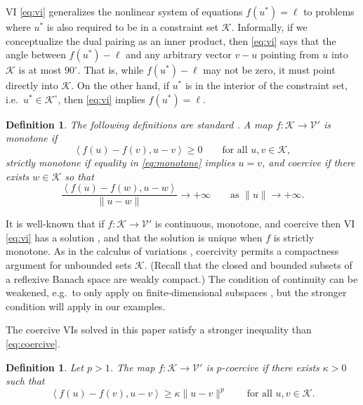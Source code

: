 \documentclass[letterpaper,final,12pt,reqno]{amsart}
\theoremstyle{cstyle}
\theoremstyle{cstyle*}
\theoremstyle{dstyle}
\newtheorem{definition}[theorem]{Definition}
\numberwithin{equation}{section}
\numberwithin{figure}{section}
\numberwithin{table}{section}
\numberwithin{theorem}{section}
\newcommand{\cK}{\mathcal{K}}
\newcommand{\cV}{\mathcal{V}}
\newcommand{\ip}[2]{\left<#1,#2\right>}
\begin{document}
VI \eqref{eq:vi} generalizes the nonlinear system of equations $f(u^*)=\ell$ to problems where $u^*$ is also required to be in a constraint set $\cK$.  Informally, if we conceptualize the dual pairing as an inner product, then \eqref{eq:vi} says that the angle between $f(u^*)-\ell$ and any arbitrary vector $v-u$ pointing from $u$ into $\cK$ is at most $90^\circ$.  That is, while $f(u^*)-\ell$ may not be zero, it must point directly into $\cK$.  On the other hand, if $u^*$ is in the interior of the constraint set, i.e.~$u^*\in\cK^\circ$, then \eqref{eq:vi} implies $f(u^*)=\ell$.

\begin{definition} The following definitions are standard \cite{KinderlehrerStampacchia1980}.  A map $f:\cK \to \cV'$ is \emph{monotone} if
\begin{equation}
\ip{f(u)-f(v)}{u-v} \ge 0 \qquad \text{for all } u,v \in \cK, \label{eq:monotone}
\end{equation}
\emph{strictly monotone} if equality in \eqref{eq:monotone} implies $u=v$, and \emph{coercive} if there exists $w \in \cK$ so that
\begin{equation}
\frac{\ip{f(u)-f(w)}{u-w}}{\|u-w\|} \to +\infty \qquad \text{as } \|u\|\to +\infty. \label{eq:coercive}
\end{equation}
\end{definition}

It is well-known that if $f:\cK \to \cV'$ is continuous, monotone, and coercive then VI \eqref{eq:vi} has a solution \cite[Corollary III.1.8]{KinderlehrerStampacchia1980}, and that the solution is unique when $f$ is strictly monotone.  As in the calculus of variations \cite{Evans2010}, coercivity permits a compactness argument for unbounded sets $\cK$.  (Recall that the closed and bounded subsets of a reflexive Banach space are weakly compact.)  The condition of continuity can be weakened, e.g.~to only apply on finite-dimensional subspaces \cite{KinderlehrerStampacchia1980}, but the stronger condition will apply in our examples.

The coercive VIs solved in this paper satisfy a stronger inequality than \eqref{eq:coercive}.

\begin{definition}  Let $p>1$.  The map $f:\cK \to \cV'$ is \emph{$p$-coercive} if there exists $\kappa>0$ such that
\begin{equation}
\ip{f(u)-f(v)}{u-v} \ge \kappa \|u-v\|^p \qquad \text{for all } u,v \in \cK. \label{eq:pcoercive}
\end{equation}
\end{definition}
\end{document}
